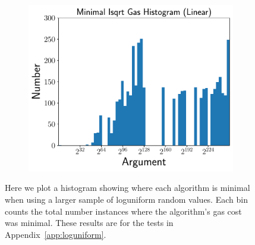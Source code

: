 \begin{figure}[p]
    \begin{subfigure}[t]{0.45\textwidth}
    \includegraphics[width=\textwidth]{plots/minimal_hist_Linear_er.pdf}
    \end{subfigure}
    \caption{Here we plot a histogram showing where each algorithm is minimal
        when using a larger sample of loguniform random values.
        Each bin counts the total number instances where the algorithm's
        gas cost was minimal.
        These results are for the tests in Appendix~\ref{app:loguniform}.
        }
    \label{fig:minimal_gas_hist_er}
\end{figure}
